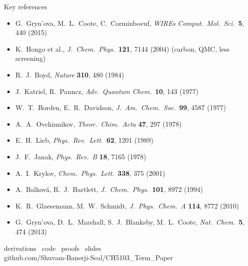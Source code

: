\begin{frame}{Key references}
  \scriptsize
  \begin{itemize}
    \item G.\ Gryn'ova, M.\ L.\ Coote, C.\ Corminboeuf, \emph{WIREs Comput.\ Mol.\ Sci.}\ \textbf{5}, 440 (2015)
    \item K.\ Hongo et al., \emph{J.\ Chem.\ Phys.}\ \textbf{121}, 7144 (2004) \quad (carbon, QMC, less screening)
    \item R.\ J.\ Boyd, \emph{Nature} \textbf{310}, 480 (1984)
    \item J.\ Katriel, R.\ Pauncz, \emph{Adv.\ Quantum Chem.}\ \textbf{10}, 143 (1977)
    \item W.\ T.\ Borden, E.\ R.\ Davidson, \emph{J.\ Am.\ Chem.\ Soc.}\ \textbf{99}, 4587 (1977)
    \item A.\ A.\ Ovchinnikov, \emph{Theor.\ Chim.\ Acta} \textbf{47}, 297 (1978)
    \item E.\ H.\ Lieb, \emph{Phys.\ Rev.\ Lett.}\ \textbf{62}, 1201 (1989)
    \item J.\ F.\ Janak, \emph{Phys.\ Rev.\ B} \textbf{18}, 7165 (1978)
    \item A.\ I.\ Krylov, \emph{Chem.\ Phys.\ Lett.}\ \textbf{338}, 375 (2001)
    \item A.\ Balkov\'a, R.\ J.\ Bartlett, \emph{J.\ Chem.\ Phys.}\ \textbf{101}, 8972 (1994)
    \item K.\ R.\ Glaesemann, M.\ W.\ Schmidt, \emph{J.\ Phys.\ Chem.\ A} \textbf{114}, 8772 (2010)
    \item G.\ Gryn'ova, D.\ L.\ Marshall, S.\ J.\ Blanksby, M.\ L.\ Coote, \emph{Nat.\ Chem.}\ \textbf{5}, 474 (2013)
  \end{itemize}
  \vskip0.1cm
  {}
\end{frame}

\begin{frame}
  \centering
  \vfill
  {\noircalli\Huge{}}
  \vskip0.5cm
  {\noirgaramond\large derivations \textbullet\ code \textbullet\ proofs \textbullet\ slides}\\[4pt]
  {\ttfamily\small github.com/Shuvam-Banerji-Seal/CH5103\_Term\_Paper}
  \vfill
\end{frame}
